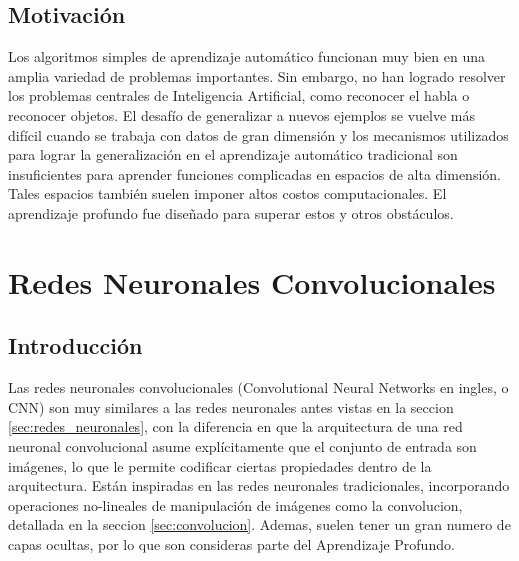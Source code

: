 \documentclass[a4paper,11pt,spanish]{book}
\begin{document}
    \subsection {Motivación}
      Los algoritmos simples de aprendizaje automático funcionan muy bien en una amplia variedad de problemas importantes.
      Sin embargo, no han logrado resolver los problemas centrales de Inteligencia Artificial, como reconocer el habla o reconocer objetos.
      El desafío de generalizar a nuevos ejemplos se vuelve más difícil cuando se trabaja con datos de gran dimensión y los mecanismos utilizados para lograr la generalización
      en el aprendizaje  automático tradicional son insuficientes para aprender funciones complicadas en espacios de alta dimensión.
      Tales espacios también suelen imponer altos costos computacionales. El aprendizaje profundo fue diseñado para superar estos y otros obstáculos.

  \section {Redes Neuronales Convolucionales}
    \subsection{Introducción}
      Las redes neuronales convolucionales (Convolutional Neural Networks en ingles, o CNN) son muy similares a las redes neuronales antes vistas en la seccion \ref{sec:redes_neuronales}, 
      con la diferencia en que la arquitectura
      de una red neuronal convolucional asume explícitamente que el conjunto de entrada son imágenes, lo que le permite codificar ciertas propiedades dentro de la arquitectura.
      Están inspiradas en las redes neuronales tradicionales, incorporando operaciones no-lineales de manipulación de imágenes como la convolucion, detallada en la seccion \ref{sec:convolucion}.
      Ademas, suelen tener un gran numero de capas ocultas, por lo que son consideras parte del Aprendizaje Profundo.
    
\end{document}
